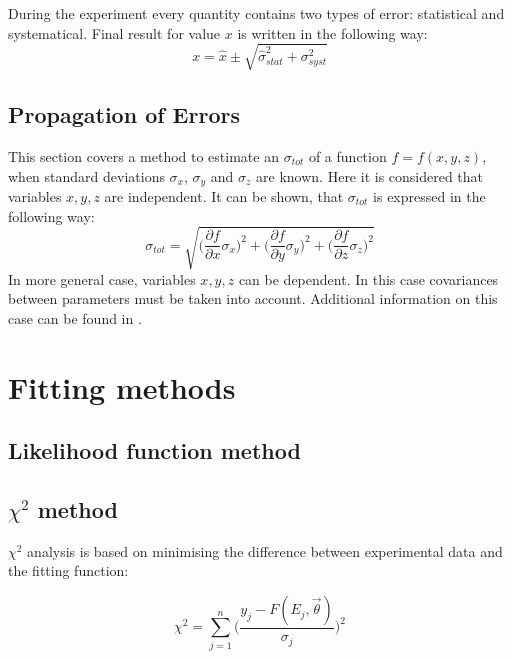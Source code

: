 \documentclass[12pt,a4paper]{report}
\begin{document}
During the experiment every quantity contains two types of error: statistical and systematical. Final result for value $x$ is written in the following way:
\begin{equation} \label{final_value}
x = \hat{x} \pm \sqrt{\hat{\sigma}_{stat}^2+\sigma^2_{syst}}
\end{equation}
 
\subsection{Propagation of Errors} \label{error_analysis}
This section covers a method to estimate an $\sigma_{tot}$ of a function $f=f(x,y,z)$, when standard deviations $\sigma_x$, $\sigma_y$ and $\sigma_z$ are known. Here it is considered that variables $x, y, z$ are independent. It can be shown, that $\sigma_{tot}$ is expressed in the following way:
\begin{equation} \label{error_propagation}
\sigma_{tot} = \sqrt{\Big ( \frac{\partial f}{\partial x} \sigma_x \Big )^2+\Big ( \frac{\partial f}{\partial y} \sigma_y \Big )^2+\Big ( \frac{\partial f}{\partial z} \sigma_z \Big )^2}
\end{equation} 
In more general case, variables $x, y, z$ can be dependent. In this case covariances between parameters must be taken into account. Additional information on this case can be found in \cite{stat_1, stat_2, stat_3}.
 

\section{Fitting methods}
\subsection{Likelihood function method}

\subsection{$\chi^2$ method}

$\chi^2$ analysis \cite{stat_2, BAKER1984437, reduced_chi_squared} is based on minimising the difference between experimental data and the fitting function:

\begin{equation} \label{chi_square_formula}
\chi^2 = \sum_{j = 1}^{n} \Big ( \frac{y_j - F(E_j,\vec{\theta})}{\sigma_j} \Big )^2 
\end{equation}
\end{document}
